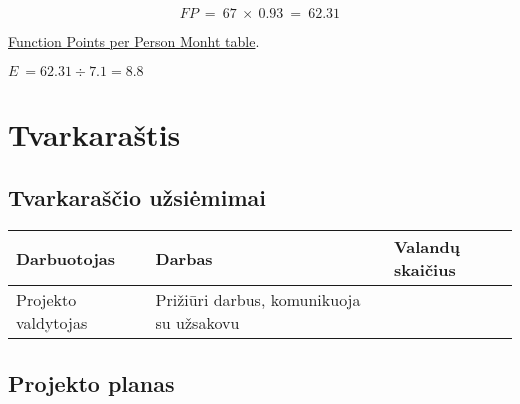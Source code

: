 \documentclass[a4paper,12pt]{article}
\begin{document}
	 $$FP \ = \ 67 \ \times \ 0.93 \ =\  62.31 $$
	 
	 \href{http://www.qsm.com/resources/performance-benchmark-tables#Business%20Function%20Point}{Function Points per Person Monht table}.

	$E \ = 62.31 \div 7.1 = 8.8$

\clearpage 



\section{ Tvarkaraštis}

\subsection{Tvarkaraščio užsiėmimai}

\begin{frame}
\centering
\hspace*{-3 cm}
\centering
\label{my-label}
\begin{tabular}{|l|l|l|}
\hline
Darbuotojas & Darbas & Valandų skaičius \\ \hline
Projekto valdytojas & Prižiūri darbus, komunikuoja su užsakovu
\end{tabular}
\end{frame}


\subsection{Projekto planas}
\end{document}
